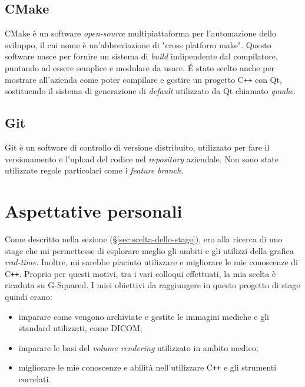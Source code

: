\subsection{CMake}\label{sec:cmake}
CMake è un software \emph{open-source} multipiattaforma per l'automazione dello sviluppo, il cui nome è un'abbreviazione di "cross platform make". Questo software nasce per fornire un sistema di \emph{build} indipendente dal compilatore, puntando ad essere semplice e modulare da usare.
\'E stato scelto anche per mostrare all'azienda come poter compilare e gestire un progetto C\texttt{++} con Qt, sostituendo il sistema di generazione di \emph{default} utilizzato da Qt chiamato \emph{qmake}.

\subsection{Git}
Git è un software di controllo di versione distribuito, utilizzato per fare il versionamento e l'upload del codice nel \emph{repository} aziendale. Non sono state utilizzate regole particolari come i \emph{feature branch}. 



\section{Aspettative personali}
Come descritto nella sezione  (§\ref{sec:scelta-dello-stage}), ero alla ricerca di uno stage che mi permettesse di esplorare meglio gli ambiti e gli utilizzi della grafica \emph{real-time}. Inoltre, mi sarebbe piaciuto utilizzare e migliorare le mie conoscenze di C\texttt{++}. Proprio per questi motivi, tra i vari colloqui effettuati, la mia scelta è ricaduta su G-Squared. I miei obiettivi da raggiungere in questo progetto di stage quindi erano:
\begin{itemize}
\item imparare come vengono archiviate e gestite le immagini mediche e gli standard utilizzati, come DICOM;
\item imparare le basi del \emph{volume rendering} utilizzato in ambito medico;
\item migliorare le mie conoscenze e abilità nell'utilizzare C\texttt{++} e gli strumenti correlati.
\end{itemize}